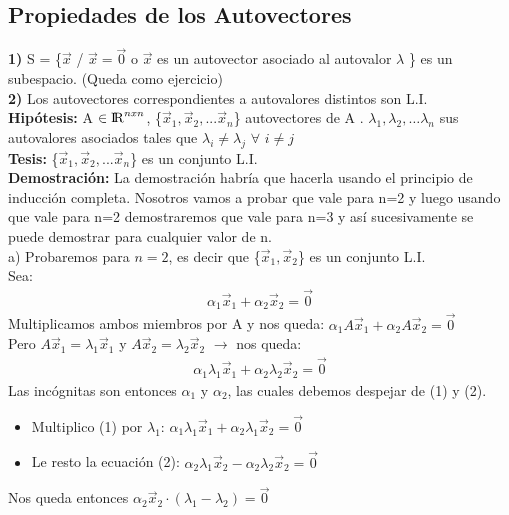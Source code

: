 \documentclass[11pt]{article}
\begin{document}
\subsection{Propiedades de los Autovectores}
\textbf{1)} S = \{$\vec{x}$ / $\vec{x} = \vec{0}$ o $\vec{x}$ es un autovector asociado al autovalor $\lambda$ \} es un subespacio. (Queda como ejercicio)\\
\textbf{2)} Los autovectores correspondientes a autovalores distintos son L.I.\\
{\bfseries {Hipótesis:}} A $\in {\rm I\!R}^{nxn}$, \{$\vec{x}_{1}, \vec{x}_2,... \vec{x}_n $\} autovectores de A . $\lambda_{1}, \lambda_{2},\ldots \lambda_{n}$ sus autovalores asociados tales que $\lambda_i \neq \lambda_j$ $\forall$ $i\neq j$ \\
{\bfseries {Tesis:}} \{$\vec{x}_{1}, \vec{x}_2,... \vec{x}_n $\} es un conjunto L.I.\\
\textbf{Demostración:} La demostración habría que hacerla usando el principio de inducción completa. Nosotros vamos a probar que vale para n=2 y luego usando que vale para n=2 demostraremos que vale para n=3 y así sucesivamente se puede demostrar para cualquier valor de n.\\
a) Probaremos para $n=2$, es decir que \{$\vec{x}_{1}, \vec{x}_2$\} es un conjunto L.I. \\
Sea: 
\begin{align}
\alpha_1\vec{x}_1+\alpha_2\vec{x}_2 = \vec{0}
\end{align}
Multiplicamos ambos miembros por A y nos queda: $\alpha_{1}A\vec{x}_1+\alpha_{2}A\vec{x}_2 = \vec{0}$\\
Pero $A\vec{x}_1 = \lambda_1\vec{x}_1$ y $A\vec{x}_2 = \lambda_2\vec{x}_2$ $\rightarrow$ nos queda:
\begin{align}
\alpha_1\lambda_1\vec{x}_1+\alpha_2\lambda_2\vec{x}_2 = \vec{0}
\end{align}
Las incógnitas son entonces $\alpha_1$ y $\alpha_2$, las cuales debemos despejar de (1) y (2).
\begin{itemize}
\item Multiplico (1) por $\lambda_1$: $\alpha_1\lambda_1\vec{x}_1+\alpha_2\lambda_1\vec{x}_2 = \vec{0}$ 
\item Le resto la ecuación (2): $\alpha_2\lambda_1\vec{x}_2 - \alpha_2\lambda_2\vec{x}_2=\vec{0}$
\end{itemize}
Nos queda entonces $\alpha_2\vec{x}_2\cdot(\lambda_1-\lambda_2)=\vec{0}$\\
\end{document}
